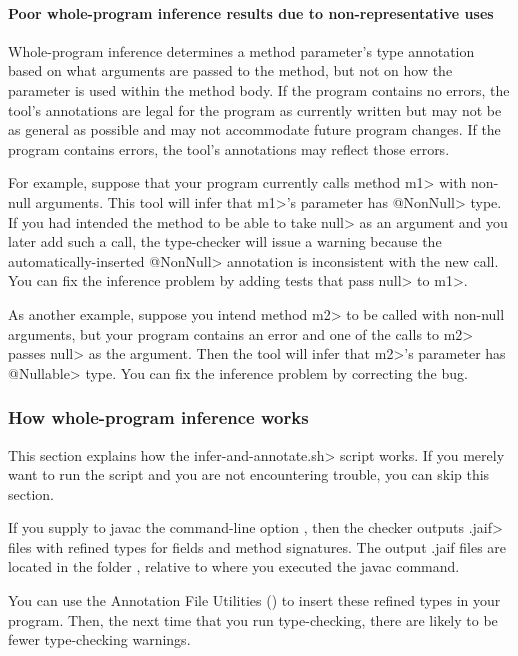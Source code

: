 \paragraph{Poor whole-program inference results due to non-representative uses\label{whole-program-inference-non-representative-uses}}

Whole-program inference determines a method parameter's type
annotation based on what arguments are passed to the method, but not on how the
parameter is used within the method body.  If the program contains
no errors, the tool's annotations are legal for the program as
currently written but may not be as general as possible and may not
accommodate future program changes.  If the program contains errors, the
tool's annotations may reflect those errors.

For example, suppose that your program currently calls
method \<m1> with non-null
arguments.  This tool will infer that \<m1>'s parameter has
\<@NonNull> type.  If you had intended the method to be able to
take \<null> as an argument and you later add such a call, the type-checker
will issue a warning because the automatically-inserted \<@NonNull>
annotation is inconsistent with the new call.
You can fix the inference problem by adding tests that pass \<null> to \<m1>.

As another example, suppose you intend method \<m2> to be called with
non-null arguments, but your program contains an error and one of the calls
to \<m2> passes \<null> as the argument.  Then the tool will infer that
\<m2>'s parameter has \<@Nullable> type.
You can fix the inference problem by correcting the bug.


\subsubsection{How whole-program inference works\label{how-whole-program-inference-works}}

This section explains how the \<infer-and-annotate.sh> script works.  If you
merely want to run the script and you are not encountering trouble, you can
skip this section.

If you
supply to javac the command-line option , then the
checker outputs \<.jaif> files with refined types for fields and method signatures.
The output .jaif files are located in the folder ,
relative to where you executed the javac command.

You can use the Annotation File Utilities
() to
insert these refined types in your program.  Then, the next time that you
run type-checking, there are likely to be fewer type-checking warnings.

